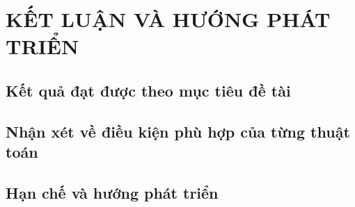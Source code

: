 \section{KẾT LUẬN VÀ HƯỚNG PHÁT TRIỂN}
\label{sec:chuong5}

\subsection{Kết quả đạt được theo mục tiêu đề tài}

\subsection{Nhận xét về điều kiện phù hợp của từng thuật toán}

\subsection{Hạn chế và hướng phát triển}
